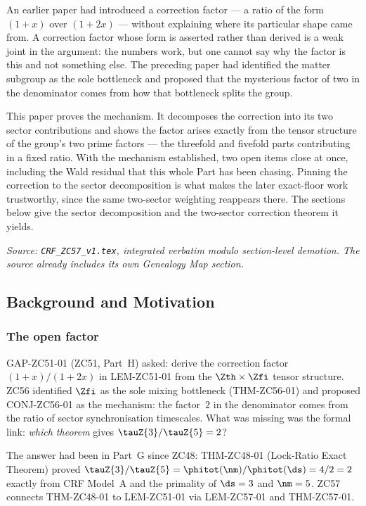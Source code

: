 \documentclass[12pt, a4paper]{article}
\begin{document}
An earlier paper had introduced a correction factor --- a ratio of the form
$(1+x)$ over $(1+2x)$ --- without explaining where its particular shape came
from. A correction factor whose form is asserted rather than derived is a weak
joint in the argument: the numbers work, but one cannot say why the factor is
this and not something else. The preceding paper had identified the matter
subgroup as the sole bottleneck and proposed that the mysterious factor of two
in the denominator comes from how that bottleneck splits the group.

This paper proves the mechanism. It decomposes the correction into its two
sector contributions and shows the factor arises exactly from the tensor
structure of the group's two prime factors --- the threefold and fivefold parts
contributing in a fixed ratio. With the mechanism established, two open items
close at once, including the Wald residual that this whole Part has been chasing.
Pinning the correction to the sector decomposition is what makes the later
exact-floor work trustworthy, since the same two-sector weighting reappears
there. The sections below give the sector decomposition and the two-sector
correction theorem it yields.
\label{sec:zc57}

\noindent
\textit{Source: \texttt{CRF\_ZC57\_v1.tex}, integrated verbatim modulo
section-level demotion. The source already includes its own Genealogy
Map section.}

\medskip
\subsection{Background and Motivation}

\subsubsection{The open factor}

GAP-ZC51-01 (ZC51, Part~H) asked: derive the correction factor
$(1+x)/(1+2x)$ in LEM-ZC51-01 from the $\Zth\times\Zfi$
tensor structure.  ZC56 identified $\Zfi$ as the sole mixing
bottleneck (THM-ZC56-01) and proposed CONJ-ZC56-01 as the
mechanism: the factor~$2$ in the denominator comes from the ratio
of sector synchronisation timescales.  What was missing was the
formal link: \emph{which theorem} gives $\tauZ{3}/\tauZ{5}=2$?

The answer had been in Part~G since ZC48: THM-ZC48-01 (Lock-Ratio
Exact Theorem) proved $\tauZ{3}/\tauZ{5}=\phitot(\nm)/\phitot(\ds)
=4/2=2$ exactly from CRF Model~A and the primality of $\ds=3$
and $\nm=5$.  ZC57 connects THM-ZC48-01 to LEM-ZC51-01 via
LEM-ZC57-01 and THM-ZC57-01.
\end{document}
